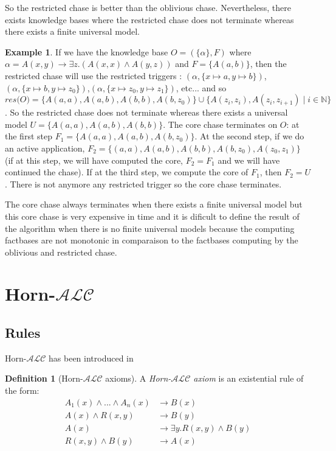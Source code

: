 \documentclass{article}
\theoremstyle{definition}
\newtheorem{definition}{Definition}[section]
\newtheorem{example}{Example}[section]
\theoremstyle{remark}
\def \N {\mathbb N}
\begin{document}
So the restricted chase is better than the oblivious chase. Nevertheless, there exists knowledge bases where the restricted chase does not terminate whereas there exists a finite universal model. \begin{example}
If we have the knowledge base $O=(\{\alpha\},F)$ where $\alpha = A(x,y) \rightarrow \exists z.(A(x,x) \wedge A(y,z))$ and $F =  \{A(a,b)\}$, then the restricted chase will use the restricted triggers : $(\alpha, \{x \mapsto a, y \mapsto b\})$, $(\alpha, \{x \mapsto b, y \mapsto z_0\})$,$(\alpha, \{x \mapsto z_0, y \mapsto z_1\})$, etc... and so  $\textit{res(O)} = \{A(a,a),A(a,b),A(b,b),A(b,z_0)\} \cup \{A(z_i,z_i),A(z_i,z_{i+1})\mid i \in \N\}$. So the restricted chase does not terminate whereas there exists a universal model $U = \{A(a,a),A(a,b),A(b,b)\}$. The core chase terminates on $O$: at the first step $F_1 = \{A(a,a),A(a,b),A(b,z_0)\}$. At the second step, if we do an active application, $F_2 = \{(a,a),A(a,b),A(b,b),A(b,z_0),A(z_0,z_1)\}$ (if at this step, we will have computed the core, $F_2 = F_1$ and we will have continued the chase). If at the third step, we compute the core of $F_1$, then $F_2 = U$. There is not anymore any restricted trigger so the core chase terminates. 
\end{example}
The core chase always terminates when there exists a finite universal model but this core chase is very expensive in time and it is dificult to define the result of the algorithm when there is no finite universal models because the computing factbases are not monotonic in comparaison to the factbases computing by the oblivious and restricted chase.

\section{Horn-$\mathcal{ALC}$}

\subsection{Rules}

Horn-$\mathcal{ALC}$ has been introduced in \cite{Horn-ALC}

\begin{definition}[Horn-$\mathcal{ALC}$ axioms]
A \emph{Horn-$\mathcal{ALC}$ axiom} is an existential rule of the form:
\begin{align}
A_1(x) \wedge...\wedge A_n(x) &\rightarrow B(x) \\
A(x) \wedge R(x,y) &\rightarrow B(y) \\
A(x) &\rightarrow \exists y.R(x,y) \wedge B(y) \\
R(x,y) \wedge B(y) &\rightarrow A(x)
\end{align}

\end{definition}
\end{document}
